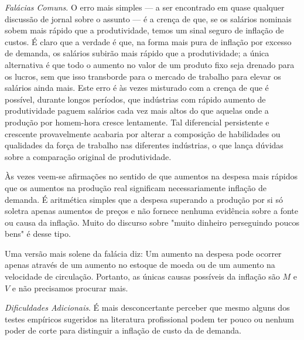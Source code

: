 \documentclass[12pt]{article}
\begin{document}
\textit{Falácias Comuns}. O erro mais simples — a ser encontrado em quase qualquer discussão de jornal sobre o assunto — é a crença de que, se os salários nominais sobem mais rápido que a produtividade, temos um sinal seguro de inflação de custos. É claro que a verdade é que, na forma mais pura de inflação por excesso de demanda, os salários subirão mais rápido que a produtividade; a única alternativa é que todo o aumento no valor de um produto fixo seja drenado para os lucros, sem que isso transborde para o mercado de trabalho para elevar os salários ainda mais. Este erro é às vezes misturado com a crença de que é possível, durante longos períodos, que indústrias com rápido aumento de produtividade paguem salários cada vez mais altos do que aquelas onde a produção por homem-hora cresce lentamente. Tal diferencial persistente e crescente provavelmente acabaria por alterar a composição de habilidades ou qualidades da força de trabalho nas diferentes indústrias, o que lança dúvidas sobre a comparação original de produtividade.

Às vezes veem-se afirmações no sentido de que aumentos na despesa mais rápidos que os aumentos na produção real significam necessariamente inflação de demanda. É aritmética simples que a despesa superando a produção por si só soletra apenas aumentos de preços e não fornece nenhuma evidência sobre a fonte ou causa da inflação. Muito do discurso sobre "muito dinheiro perseguindo poucos bens" é desse tipo.

Uma versão mais solene da falácia diz: Um aumento na despesa pode ocorrer apenas através de um aumento no estoque de moeda ou de um aumento na velocidade de circulação. Portanto, as únicas causas possíveis da inflação são $M$ e $V$ e não precisamos procurar mais.

\textit{Dificuldades Adicionais}. É mais desconcertante perceber que mesmo alguns dos testes empíricos sugeridos na literatura profissional podem ter pouco ou nenhum poder de corte para distinguir a inflação de custo da de demanda.
\end{document}
